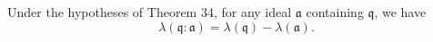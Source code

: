 Under the hypotheses of Theorem 34, for any ideal $\mathfrak{a}$ containing $\mathfrak{q}$, we have
$$\lambda(\mathfrak{q} : \mathfrak{a}) = \lambda(\mathfrak{q}) - \lambda(\mathfrak{a}).$$

